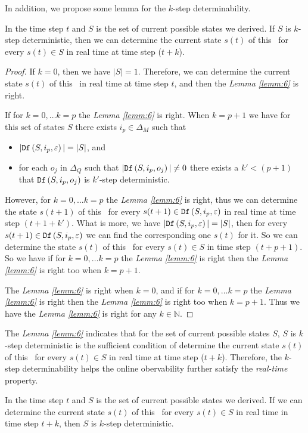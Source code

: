 In addition, we propose some lemma for the $k$-step determinability.
\begin{lemma}
 In the time step $t$ and $S$ is the set of current possible states we derived. If $S$ is $k$-step deterministic, then we can determine the current state $s(t)$ of this \BCN\ for every $s(t)\in S$ in real time at time step ($t+k$).
  \label{lemm:6}
\end{lemma}
\begin{proof} If $k=0$, then we have $|S|=1$. Therefore, we can determine the current state $s(t)$ of this \BCN\ in real time at time step $t$, and then the {\em Lemma \ref{lemm:6}} is right. 

If for $k=0,\ldots k=p$ the {\em Lemma \ref{lemm:6}} is right. When $k=p+1$ we have for this set of states $S$ there exists $i_p \in \Delta_M$ such that
 \begin{itemize}
 \item  $|{\tt Df}\left(S,i_p,\varepsilon\right)|=|S|$, and 
 \item  for each $o_j$ in $\Delta_Q$ such that $|{\tt Df}\left(S,i_p,o_j\right)|\neq 0$ there exists a ${k'}<(p+1)$ that ${\tt Df}\left(S,i_p,o_j\right)$ is $k'$-step deterministic.
 \end{itemize}
 However, for $k=0,\ldots k=p$ the {\em Lemma \ref{lemm:6}} is right, thus we can determine the state $s(t+1)$ of this \BCN\ for every $s(t+1)\in {\tt Df}\left(S,i_p,\varepsilon\right)$ in real time at time step $(t+1+k')$. What is more, we have $|{\tt Df}\left(S,i_p,\varepsilon\right)|=|S|$, then for every $s(t+1)\in {\tt Df}\left(S,i_p,\varepsilon\right)$ we can find the corresponding one $s(t)$ for it. So we can determine the state $s(t)$ of this \BCN\ for every $s(t)\in S$ in time step $(t+p+1)$. So we have if for $k=0,\ldots k=p$ the {\em Lemma \ref{lemm:6}} is right then the {\em Lemma \ref{lemm:6}} is right too when $k=p+1$. 
 
The {\em Lemma \ref{lemm:6}} is right when $k=0$, and if for $k=0,\ldots k=p$ the {\em Lemma \ref{lemm:6}} is right then the {\em Lemma \ref{lemm:6}} is right too when $k=p+1$. Thus we have the {\em Lemma \ref{lemm:6}} is right for any $k\in \mathbb{N}$.
\end{proof}

The {\em Lemma \ref{lemm:6}} indicates that for the set of current possible states $S$, $S$ is $k$-step deterministic is the sufficient condition of determine the current state $s(t)$ of this \BCN\ for every $s(t)\in S$ in real time at time step ($t+k$). Therefore, the $k$-step determinability helps the online obervability further satisfy the {\em real-time} property. 
\begin{lemma}
 In the time step $t$ and $S$ is the set of current possible states we derived. If we can determine the current state $s(t)$ of this \BCN\ for every $s(t)\in S$ in real time in time step $t+k$, then $S$ is $k$-step deterministic. 
  \label{lemm:7}
\end{lemma}

